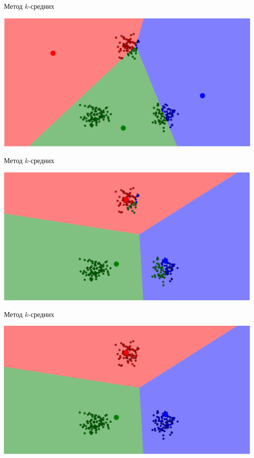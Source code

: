 \documentclass[10pt]{beamer}
\begin{document}
\begin{frame}{Метод $k$-средних}
	\begin{center}
	  \includegraphics[width= \textwidth, keepaspectratio = true]{images/kmeans1}   
	\end{center}
\end{frame}

\begin{frame}{Метод $k$-средних}
	\begin{center}
	  \includegraphics[width= \textwidth, keepaspectratio = true]{images/kmeans2}   
	\end{center}
\end{frame}

\begin{frame}{Метод $k$-средних}
	\begin{center}
	  \includegraphics[width= \textwidth, keepaspectratio = true]{images/kmeans3}   
	\end{center}
\end{frame}
\end{document}
